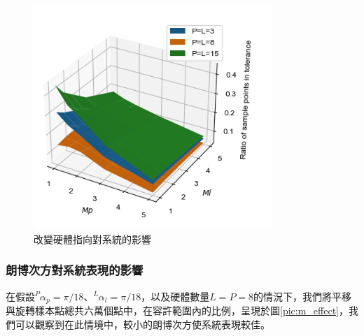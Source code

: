 \begin{figure}[htpb]
    \centering
    \includegraphics[width=9cm]{ch4pic/m_effect.png}
    \caption{改變硬體指向對系統的影響}
    \label{pic:alpha_effect}
\end{figure}

\subsubsection{朗博次方對系統表現的影響}
\label{chp:m_effect}

在假設$^P\alpha_p =\pi/18$、$^L\alpha_l = \pi/18$，以及硬體數量$L=P=8$的情況下，我們將平移與旋轉樣本點總共六萬個點中，在容許範圍內的比例，呈現於圖\ref{pic:m_effect}，我們可以觀察到在此情境中，較小的朗博次方使系統表現較佳。




